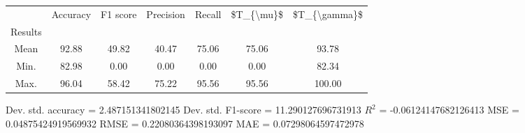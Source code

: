 \begin{tabular}{|c|c|c|c|c|c|c|}
\toprule
{} &  Accuracy &  F1 score &  Precision &  Recall &  \$T\_\{\textbackslash mu\}\$ &  \$T\_\{\textbackslash gamma\}\$ \\
Results &           &           &            &         &            &               \\
\hline
Mean    &     92.88 &     49.82 &      40.47 &   75.06 &      75.06 &         93.78 \\
Min.    &     82.98 &      0.00 &       0.00 &    0.00 &       0.00 &         82.34 \\
Max.    &     96.04 &     58.42 &      75.22 &   95.56 &      95.56 &        100.00 \\
\bottomrule
\end{tabular}

 Dev. std. accuracy = 2.487151341802145
 Dev. std. F1-score = 11.290127696731913
 $R^2$ = -0.06124147682126413
 MSE = 0.04875424919569932
 RMSE = 0.22080364398193097
 MAE = 0.07298064597472978